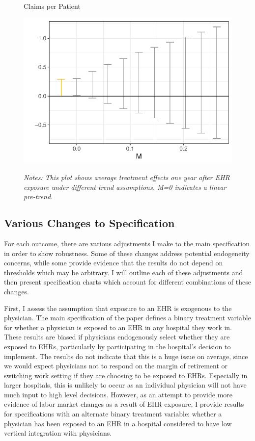 \documentclass[12pt]{article}
\begin{document}
\begin{figure}[ht]
    \centering
    \captionsetup{width=.5\linewidth}
    \caption{Claims per Patient}
    \includegraphics[scale=.5]{Objects/claim_pretrends_plot.pdf}
    \label{fig:pre_claim}
    \vspace{2mm}
    \caption*{\footnotesize{\textit{Notes: This plot shows average treatment effects one year after EHR exposure under different trend assumptions. M=0 indicates a linear pre-trend.}}}
\end{figure}

\subsection{Various Changes to Specification}\label{sec:changes}

For each outcome, there are various adjustments I make to the main specification in order to show robustness. Some of these changes address potential endogeneity concerns, while some provide evidence that the results do not depend on thresholds which may be arbitrary. I will outline each of these adjustments and then present specification charts which account for different combinations of these changes. 


First, I assess the assumption that exposure to an EHR is exogenous to the physician. The main specification of the paper defines a binary treatment variable for whether a physician is exposed to an EHR in any hospital they work in. These results are biased if physicians endogenously select whether they are exposed to EHRs, particularly by participating in the hospital's decision to implement. The results do not indicate that this is a huge issue on average, since we would expect physicians not to respond on the margin of retirement or switching work setting if they are choosing to be exposed to EHRs. Especially in larger hospitals, this is unlikely to occur as an individual physician will not have much input to high level decisions. However, as an attempt to provide more evidence of labor market changes as a result of EHR exposure, I provide results for specifications with an alternate binary treatment variable: whether a physician has been exposed to an EHR in a hospital considered to have low vertical integration with physicians. 
\end{document}
